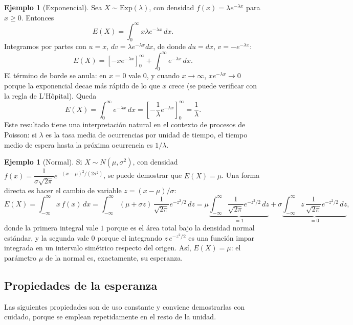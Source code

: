 \documentclass[11pt,a4paper]{article}
\theoremstyle{plain}
\theoremstyle{definition}
\newtheorem{ejemplo}[teorema]{Ejemplo}
\theoremstyle{remark}
\begin{document}
\begin{ejemplo}[Exponencial]
Sea $X\sim\text{Exp}(\lambda)$, con densidad $f(x)=\lambda e^{-\lambda x}$ para $x\geq0$. Entonces
\[
E(X) = \int_0^\infty x\lambda e^{-\lambda x}\,dx.
\]
Integramos por partes con $u=x$, $dv=\lambda e^{-\lambda x}dx$, de donde $du=dx$, $v=-e^{-\lambda x}$:
\[
E(X) = \left[-xe^{-\lambda x}\right]_0^\infty + \int_0^\infty e^{-\lambda x}\,dx.
\]
El término de borde se anula: en $x=0$ vale $0$, y cuando $x\to\infty$, $xe^{-\lambda x}\to 0$ porque la exponencial decae más rápido de lo que $x$ crece (se puede verificar con la regla de L'Hôpital). Queda
\[
E(X) = \int_0^\infty e^{-\lambda x}\,dx = \left[-\frac{1}{\lambda}e^{-\lambda x}\right]_0^\infty = \frac{1}{\lambda}.
\]
Este resultado tiene una interpretación natural en el contexto de procesos de Poisson: si $\lambda$ es la tasa media de ocurrencias por unidad de tiempo, el tiempo medio de espera hasta la próxima ocurrencia es $1/\lambda$.
\end{ejemplo}

\begin{ejemplo}[Normal]
Si $X\sim N(\mu,\sigma^2)$, con densidad $f(x)=\dfrac{1}{\sigma\sqrt{2\pi}}e^{-(x-\mu)^2/(2\sigma^2)}$, se puede demostrar que $E(X)=\mu$. Una forma directa es hacer el cambio de variable $z=(x-\mu)/\sigma$:
\[
E(X) = \int_{-\infty}^\infty x\, f(x)\,dx = \int_{-\infty}^\infty (\mu+\sigma z)\,\frac{1}{\sqrt{2\pi}}e^{-z^2/2}\,dz = \mu\underbrace{\int_{-\infty}^\infty \frac{1}{\sqrt{2\pi}}e^{-z^2/2}\,dz}_{=1} + \sigma\underbrace{\int_{-\infty}^\infty z\,\frac{1}{\sqrt{2\pi}}e^{-z^2/2}\,dz}_{=0},
\]
donde la primera integral vale $1$ porque es el área total bajo la densidad normal estándar, y la segunda vale $0$ porque el integrando $z\,e^{-z^2/2}$ es una función impar integrada en un intervalo simétrico respecto del origen. Así, $E(X)=\mu$: el parámetro $\mu$ de la normal es, exactamente, su esperanza.
\end{ejemplo}

\subsection{Propiedades de la esperanza}
\label{sec:propiedades-esperanza}

Las siguientes propiedades son de uso constante y conviene demostrarlas con cuidado, porque se emplean repetidamente en el resto de la unidad.
\end{document}
